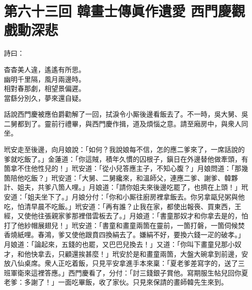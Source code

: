 
\chapter*{第六十三回 韓畫士傳眞作遺愛 西門慶觀戲動深悲}


詩曰：

\begin{myquote} 
杳杳美人違，遙遙有所思。\\幽明千里隔，風月兩邊時。\\相對春那劇，相望景偏遲。\\當繇分別久，夢來還自疑。
\end{myquote} 

話說西門慶被應伯爵勸解了一回，拭淚令小厮後邊看飯去了。不一時，吳大舅、吳二舅都到了。靈前行禮畢，與西門慶作揖，道及煩惱之意。請至廂房中，與衆人同坐。

玳安走至後邊，向月娘說：「如何？我說娘每不信，怎的應二爹來了，一席話說的爹就吃飯了。」金蓮道：「你這賊，積年久慣的囚根子，鎭日在外邊替他做牽頭，有箇拿不住他性兒的！」玳安道：「從小兒答應主子，不知心腹？」月娘問道：「那幾箇陪他吃飯？」玳安道：「大舅、二舅纔來，和溫師父，連應二爹、謝爹、韓夥計、姐夫，共爹八箇人哩。」月娘道：「請你姐夫來後邊吃罷了，也擠在上頭！」玳安道：「姐夫坐下了。」月娘分付：「你和小厮往廚房裡拿飯去。你另拿甌兒粥與他吃，怕清早晨不吃飯。」玳安道：「再有誰？止我在家，都使出報䘮、買東西，王經，又使他往張親家爹那裡借雲板去了。」月娘道：「書童那奴才和你拿去是的，怕打了他紗帽展翅兒！」玳安道：「書童和畫童兩箇在靈前，一箇打磐，一箇伺候焚香燒紙哩。春鴻，爹又使他跟賁四換絹去了。嫌絹不好，要換六錢一疋的破孝。」月娘道：「論起來，五錢的也罷，又巴巴兒換去！」又道：「你叫下畫童兒那小奴才，和他快拿去，只顧還挨甚麼！」玳安於是和畫童兩箇，大盤大碗拿到前邊，安放八仙桌席。衆人正吃着飯，只見平安拿進手本來稟：「夏老爹差寫字的，送了三班軍衛來這裡答應。」西門慶看了，分付：「討三錢銀子賞他。寫期服生帖兒回你夏老爹：多謝了！」一面吃畢飯，收了家伙。只見來保請的畫師韓先生來到。

